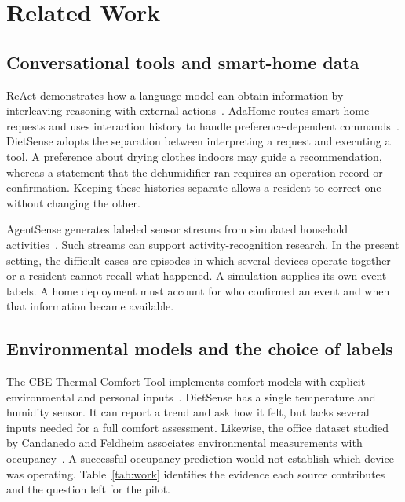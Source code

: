 \section{Related Work}\label{sec:related}
\subsection{Conversational tools and smart-home data}
ReAct demonstrates how a language model can obtain information by interleaving reasoning with external actions~\cite{react}. AdaHome routes smart-home requests and uses interaction history to handle preference-dependent commands~\cite{adahome}. DietSense adopts the separation between interpreting a request and executing a tool. A preference about drying clothes indoors may guide a recommendation, whereas a statement that the dehumidifier ran requires an operation record or confirmation. Keeping these histories separate allows a resident to correct one without changing the other.

AgentSense generates labeled sensor streams from simulated household activities~\cite{agentsense}. Such streams can support activity-recognition research. In the present setting, the difficult cases are episodes in which several devices operate together or a resident cannot recall what happened. A simulation supplies its own event labels. A home deployment must account for who confirmed an event and when that information became available.

\subsection{Environmental models and the choice of labels}
The CBE Thermal Comfort Tool implements comfort models with explicit environmental and personal inputs~\cite{cbe}. DietSense has a single temperature and humidity sensor. It can report a trend and ask how it felt, but lacks several inputs needed for a full comfort assessment. Likewise, the office dataset studied by Candanedo and Feldheim associates environmental measurements with occupancy~\cite{occupancy}. A successful occupancy prediction would not establish which device was operating. Table~\ref{tab:work} identifies the evidence each source contributes and the question left for the pilot.


